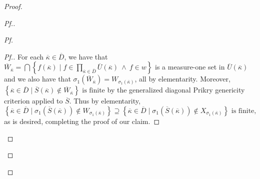 \documentclass{amsart}
\theoremstyle{definition}
\theoremstyle{remark}
\renewcommand{\S}{{\overline{S}}}
\newcommand{\st}{\; | \;}
\newcommand{\set}[2]{\left\{#1\st #2 \right\}}
\begin{document}
\begin{proof}
\begin{proof}[Pf.]
\begin{proof}[Pf]
\begin{proof}[Pf.]
For each $\overline \kappa \in \overline D$, we have that $\overline W_{\overline \kappa} = \bigcap \set{f(\overline \kappa) }{ f \in \prod_{\overline \kappa \in \overline D} \overline U(\overline \kappa) \ \land \ f \in w }$ is a measure-one set in $\overline U(\overline \kappa)$ and we also have that $\sigma_1(\overline W_{\overline \kappa}) = W_{\sigma_1(\overline \kappa)}$, all by elementarity. Moreover, 
$\set{\overline \kappa \in \overline D}{\overline S(\overline \kappa) \notin \overline W_{\overline \kappa}} \text{ is finite}$ by the generalized diagonal Prikry genericity criterion applied to $\overline S$.
Thus by elementarity,
$$\set{ \overline \kappa \in \overline D }{ \sigma_1(\S(\overline \kappa)) \notin W_{\sigma_1(\overline \kappa)} } \supseteq \set{ \overline \kappa \in \overline D }{ \sigma_1(\S(\overline \kappa)) \notin X_{\sigma_1(\overline \kappa)}} \text{ is finite,}$$
as is desired, completing the proof of our claim.
\end{proof}



\end{proof}
\end{proof}
\end{proof}
\end{document}

